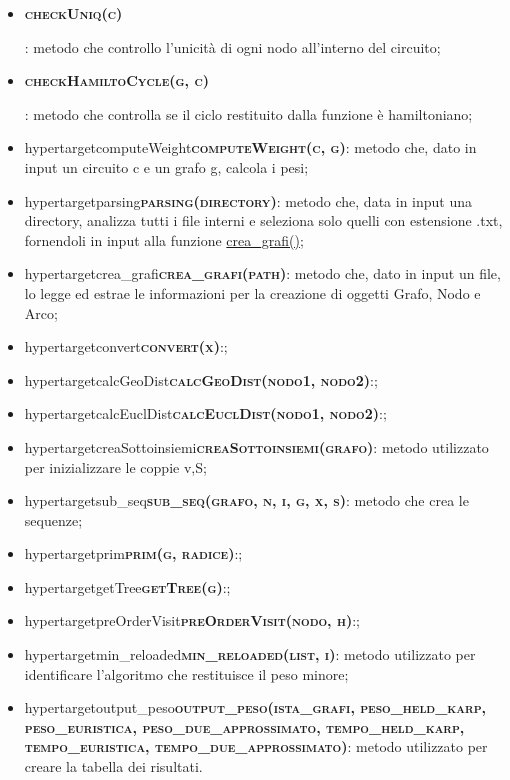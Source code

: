 \begin{itemize}
    \item \hypertarget{cehckUniq}{\textbf{\textsc{checkUniq(c)}}}: metodo che controllo l'unicità di ogni nodo all'interno del circuito;
    \item \hypertarget{checkHamiltoCycle}{\textbf{\textsc{checkHamiltoCycle(g, c)}}}: metodo che controlla se il ciclo restituito dalla funzione è hamiltoniano;
    \item hypertarget{computeWeight}{\textbf{\textsc{computeWeight(c, g)}}}: metodo che, dato in input un circuito c e un grafo g, calcola i pesi;
    \item hypertarget{parsing}{\textbf{\textsc{parsing(directory)}}}: metodo che, data in input una directory, analizza tutti i file interni e seleziona solo quelli con estensione .txt, fornendoli in input alla funzione \hyperlink{creagrafi}{crea\_grafi()};
    \item hypertarget{crea\_grafi}{\textbf{\textsc{crea\_grafi(path)}}}: metodo che, dato in input un file, lo legge ed estrae le informazioni per la creazione di oggetti Grafo, Nodo e Arco;
    \item hypertarget{convert}{\textbf{\textsc{convert(x)}}}:;
    \item hypertarget{calcGeoDist}{\textbf{\textsc{calcGeoDist(nodo1, nodo2)}}}:;
    \item hypertarget{calcEuclDist}{\textbf{\textsc{calcEuclDist(nodo1, nodo2)}}}:;
    \item hypertarget{creaSottoinsiemi}{\textbf{\textsc{creaSottoinsiemi(grafo)}}}: metodo utilizzato per inizializzare le coppie v,S;
    \item hypertarget{sub\_seq}{\textbf{\textsc{sub\_seq(grafo, n, i, g, x, s)}}}: metodo che crea le sequenze;
    \item hypertarget{prim}{\textbf{\textsc{prim(g, radice)}}}:;
    \item hypertarget{getTree}{\textbf{\textsc{getTree(g)}}}:;
    \item hypertarget{preOrderVisit}{\textbf{\textsc{preOrderVisit(nodo, h)}}}:;
    \item hypertarget{min\_reloaded}{\textbf{\textsc{min\_reloaded(list, i)}}}: metodo utilizzato per identificare l'algoritmo che restituisce il peso minore;
    \item hypertarget{output\_peso}{\textbf{\textsc{output\_peso(ista\_grafi, peso\_held\_karp, peso\_euristica, peso\_due\_approssimato, tempo\_held\_karp, tempo\_euristica, tempo\_due\_approssimato)}}}: metodo utilizzato per creare la tabella dei risultati.
\end{itemize}

